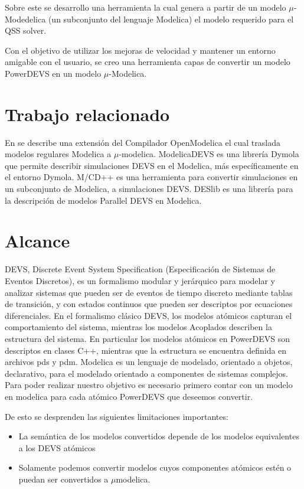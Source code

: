 \documentclass[a4paper,	11pt]{report}
\begin{document}
Sobre este se desarrollo una herramienta la cual genera a partir de un modelo $\mu$-Modedelica \cite{Ber12} (un subconjunto del lenguaje Modelica) el modelo requerido para el QSS solver.

Con el objetivo de utilizar los mejoras de velocidad y mantener un entorno amigable con el usuario, se creo una herramienta capas de convertir un modelo PowerDEVS en un modelo $\mu$-Modelica.


\section{Trabajo relacionado}
En \cite{Ber12} se describe una extensión del Compilador OpenModelica el cual traslada modelos regulares Modelica a $\mu$-modelica. 
ModelicaDEVS \cite{Beltrame06quantisedstate} es una librería Dymola que permite describir simulaciones DEVS en el Modelica, más específicamente en el entorno Dymola.
M/CD++ \cite{conf/mascots/DAbreuW05} es una herramienta para convertir simulaciones en un subconjunto de Modelica, a simulaciones DEVS.
DESlib \cite{Sanz09paralleldevs} es una librería para la descripción de modelos Parallel DEVS en Modelica.


\section{Alcance}
DEVS\cite{Zeigler:2000:TMS:580780}, Discrete Event System Specification (Especificación de Sistemas de Eventos Discretos), es un formalismo modular y jerárquico para modelar y analizar sistemas que pueden ser de eventos de tiempo discreto mediante tablas de transición, y con estados continuos que pueden ser descriptos por ecuaciones diferenciales.
En el formalismo clásico DEVS, los modelos atómicos capturan el comportamiento del sistema, mientras los modelos Acoplados describen la estructura del sistema.
En particular los modelos atómicos en PowerDEVS son descriptos en clases C++, mientras que la estructura se encuentra definida en archivos pds y pdm.
Modelica es un lenguaje de modelado, orientado a objetos, declarativo, para el modelado orientado a componentes de sistemas complejos.
Para poder realizar nuestro objetivo es necesario primero contar con un modelo  en modelica\cite{Fritzson02modelica--} para cada atómico PowerDEVS\cite{BK11} que deseemos convertir. 

De esto se desprenden las siguientes limitaciones importantes:
\begin{itemize}
	\item La semántica de los modelos convertidos depende de los modelos equivalentes a los DEVS atómicos 
	\item Solamente podemos convertir modelos cuyos componentes atómicos estén o puedan ser convertidos a $\mu$modelica.
\end{itemize}
\end{document}
